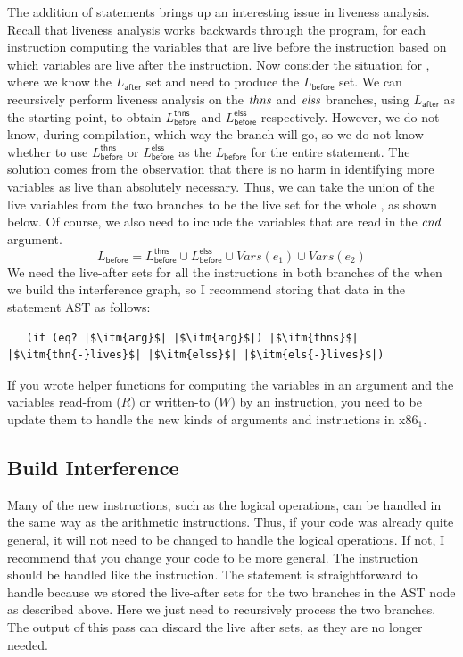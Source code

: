 \documentclass[11pt]{book}
\begin{document}
The addition of  statements brings up an interesting issue in
liveness analysis. Recall that liveness analysis works backwards
through the program, for each instruction computing the variables that
are live before the instruction based on which variables are live
after the instruction. Now consider the situation for , where we know the
$L_{\mathsf{after}}$ set and need to produce the $L_{\mathsf{before}}$
set.  We can recursively perform liveness analysis on the $\mathit{thns}$
and $\mathit{elss}$ branches, using $L_{\mathsf{after}}$ as the starting
point, to obtain $L^{\mathsf{thns}}_{\mathsf{before}}$ and
$L^{\mathsf{elss}}_{\mathsf{before}}$ respectively. However, we do not
know, during compilation, which way the branch will go, so we do not
know whether to use $L^{\mathsf{thns}}_{\mathsf{before}}$ or
$L^{\mathsf{elss}}_{\mathsf{before}}$ as the $L_{\mathsf{before}}$ for
the entire  statement. The solution comes from the observation
that there is no harm in identifying more variables as live than
absolutely necessary. Thus, we can take the union of the live
variables from the two branches to be the live set for the whole
, as shown below. Of course, we also need to include the
variables that are read in the $\mathit{cnd}$ argument.
\[
  L_{\mathsf{before}} = L^{\mathsf{thns}}_{\mathsf{before}} \cup 
  L^{\mathsf{elss}}_{\mathsf{before}} \cup
  \mathit{Vars}(e_1) \cup \mathit{Vars}(e_2)
\]
We need the live-after sets for all the instructions in both branches
of the  when we build the interference graph, so I recommend
storing that data in the  statement AST as follows:
\begin{lstlisting}
   (if (eq? |$\itm{arg}$| |$\itm{arg}$|) |$\itm{thns}$| |$\itm{thn{-}lives}$| |$\itm{elss}$| |$\itm{els{-}lives}$|)
\end{lstlisting}

If you wrote helper functions for computing the variables in an
argument and the variables read-from ($R$) or written-to ($W$) by an
instruction, you need to be update them to handle the new kinds of
arguments and instructions in x86$_1$.

\subsection{Build Interference}
\label{sec:build-interference-r2}

Many of the new instructions, such as the logical operations, can be
handled in the same way as the arithmetic instructions. Thus, if your
code was already quite general, it will not need to be changed to
handle the logical operations. If not, I recommend that you change
your code to be more general. The  instruction should be
handled like the  instruction. The  statement is
straightforward to handle because we stored the live-after sets for the
two branches in the AST node as described above. Here we just need to
recursively process the two branches. The output of this pass can
discard the live after sets, as they are no longer needed.
\end{document}
